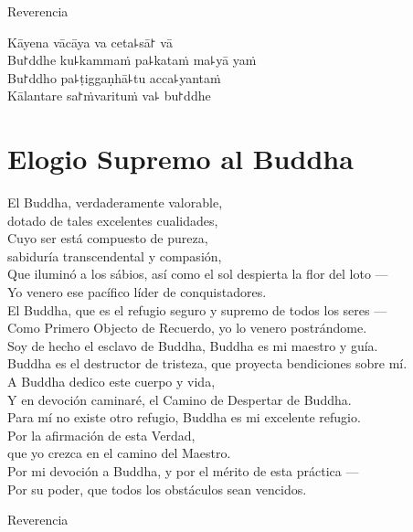 \begin{instruction}
  Reverencia
\end{instruction}

Kāyena vācāya va ceta꜕sā꜓ vā\\
Bu꜓ddhe ku꜕kammaṁ pa꜕kataṁ ma꜕yā yaṁ\\
Bu꜓ddho pa꜕ṭiggaṇhā꜕tu acca꜕yantaṁ\\
Kālantare sa꜓ṁvarituṁ va꜕ bu꜓ddhe

\clearpage

\chapter{Elogio Supremo al Buddha}

\begin{leader}
\end{leader}

El Buddha, verdaderamente valorable,\\
\vin dotado de tales excelentes cualidades,\\
Cuyo ser está compuesto de pureza,\\
\vin sabiduría transcendental y compasión,\\
Que iluminó a los sábios, así como el sol despierta la flor del loto ---\\
Yo venero ese pacífico líder de conquistadores.\\
El Buddha, que es el refugio seguro y supremo de todos los seres ---\\
Como Primero Objecto de Recuerdo, yo lo venero postrándome.\\
Soy de hecho el esclavo de Buddha, Buddha es mi maestro y guía.\\
Buddha es el destructor de tristeza, que proyecta bendiciones sobre mí.\\
A Buddha dedico este cuerpo y vida,\\
Y en devoción caminaré, el Camino de Despertar de Buddha.\\
Para mí no existe otro refugio, Buddha es mi excelente refugio.\\
Por la afirmación de esta Verdad,\\
\vin que yo crezca en el camino del Maestro.\\
Por mi devoción a Buddha, y por el mérito de esta práctica ---\\
Por su poder, que todos los obstáculos sean vencidos.

\begin{instruction}
  Reverencia
\end{instruction}

